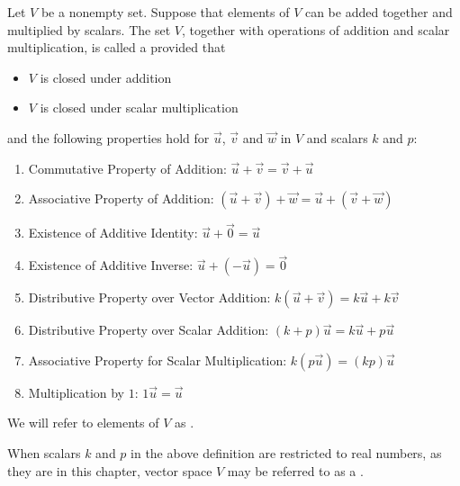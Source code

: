 \documentclass{ximera}
\begin{document}
  \begin{definition}\label{def:vectorspacegeneral} 
  Let $V$ be a nonempty set.  Suppose that elements of $V$ can be added together and multiplied by scalars.  The set $V$, together with operations of addition and scalar multiplication, is called a  provided that 
  \begin{itemize}
  \item[] $V$ is closed under addition
  \item[] $V$ is closed under scalar multiplication
  \end{itemize}
  and the following properties hold for $\vec{u}$, $\vec{v}$ and $\vec{w}$ in $V$ and scalars $k$ and $p$:
  \begin{enumerate}
   \item \label{item:commaddvectspdef}
  Commutative Property of Addition:\quad
  $\vec{u}+\vec{v}=\vec{v}+\vec{u}$
  \item \label{item:assaddvectspdef}
  Associative Property of Addition:\quad
  $(\vec{u}+\vec{v})+\vec{w}=\vec{u}+(\vec{v}+\vec{w})$
  \item \label{item:idaddvectspdef}
  Existence of Additive Identity:\quad
  $\vec{u}+\vec{0}=\vec{u}$
  \item \label{item:invaddvectspdef}
  Existence of Additive Inverse:\quad
  $\vec{u}+(-\vec{u})=\vec{0}$
  \item \label{item:distvectaddvectspdef}
  Distributive Property over Vector Addition:\quad
  $k(\vec{u}+\vec{v})=k\vec{u}+k\vec{v}$
  \item \label{item:distscalaraddvectspdef}
  Distributive Property over Scalar Addition:\quad
  $(k+p)\vec{u}=k\vec{u}+p\vec{u}$
  \item \label{item:assmultvectspdef}
  Associative Property for Scalar Multiplication:\quad
  $k(p\vec{u})=(kp)\vec{u}$
  \item \label{item:idmultvectspdef}
  Multiplication by $1$:\quad
  $1\vec{u}=\vec{u}$
  \end{enumerate}
We will refer to elements of $V$ as .  
\end{definition}

When scalars $k$ and $p$ in the above definition are restricted to real numbers, as they are in this chapter, vector space $V$ may be referred to as  a .
\end{document}
